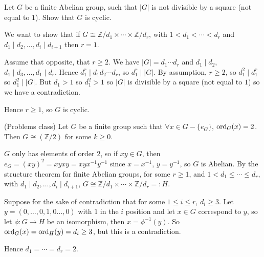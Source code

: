 \begin{example}
	Let $G$ be a finite Abelian group, such that $|G|$ is not divisible by a square (not equal to $1$). Show that $G$ is cyclic.

	We want to show that if $G \cong \mathbb{Z} / d_1 \times \cdots \times \mathbb{Z} / d_r$, with $1 < d_1 < \cdots < d_r$ and $d_1 \mid d_2, \dots, d_i \mid d_{i + 1}$ then $r = 1$.

	Assume that opposite, that $r \ge 2$. We have $|G| = d_1 \cdots d_r$ and $d_1 \mid d_2$, $d_1 \mid d_3, \dots, d_1 \mid d_r$. Hence $d_1^r \mid d_1 d_2 \cdots d_r$, so $d_1^r \mid |G|$. By assumption, $r \ge 2$, so $d_1^2 \mid d_1^r$ so $d_1^2 \mid |G|$. But $d_1 > 1$ so $d_1^2 > 1$ so $|G|$ is divisible by a square (not equal to $1$) so we have a contradiction.

	Hence $r \ge 1$, so $G$ is cyclic.
\end{example}

\begin{example}
	(Problems class) Let $G$ be a finite group such that $\forall x \in G - \{ e_G \}$, $\text{ord}_G(x) = 2$. Then $G \cong {(\mathbb{Z} / 2)}$ for some $k \ge 0$.

	$G$ only has elements of order $2$, so if $xy \in G$, then $e_G = (xy)^2 = xyxy = xyx^{-1} y^{-1}$ since $x = x^{-1}$, $y = y^{-1}$, so $G$ is Abelian. By the structure theorem for finite Abelian groups, for some $r \ge 1$, and $1 < d_1 \le \cdots \le d_r$, with $d_1 \mid d_2, \dots, d_i \mid d_{i + 1}$, $G \cong \mathbb{Z} / d_1 \times \cdots \times \mathbb{Z} / d_r =: H$.
	
	Suppose for the sake of contradiction that for some $1 \le i \le r$, $d_i \ge 3$. Let $y = (0, \dots, 0, 1, 0 \dots, 0)$ with $1$ in the $i$ position and let $x \in G$ correspond to $y$, so let $\phi: G \to H$ be an isomorphism, then $x = \phi^{-1} (y)$. So $\text{ord}_G(x) = \text{ord}_H(y) = d_i \ge 3$, but this is a contradiction.

	Hence $d_1 = \cdots = d_r = 2$.
\end{example}

